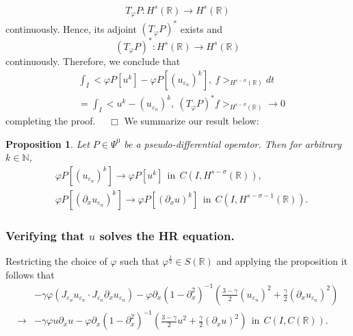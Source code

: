 \documentclass{beamer}
\newcommand{\rr}{\mathbb{R}}
\newcommand{\p}{\partial}
\newcommand{\ee}{\varepsilon}
\newcommand{\vp}{\varphi}
\newtheorem{proposition}{Proposition}
\begin{document}
\begin{frame}
	\begin{equation*}
		\begin{split}
			T_\vp P: H^s(\rr) \to H^s(\rr)
		\end{split}
	\end{equation*}
	continuously. Hence, its adjoint  $(T_\varphi P)^*$
	exists and
		\begin{equation*}
			(T_\varphi P)^*: H^s(\rr) \to H^s(\rr) 
		\end{equation*}
		continuously. Therefore, we conclude that
		\begin{equation}
			\label{widpseudo}
			\begin{split}
				& \int_I <\varphi P[u^k] - \varphi
				P [(u_{\ee_n})^k],\  f>_{H^{s-\sigma }(\rr)} dt
				\\
				&= \int_I <u^k - 
				 (u_{\ee_n})^k, \ (T_\vp P)^* f>_{H^{s-\sigma }(\rr)} \to 0
			\end{split}
		\end{equation}
		completing the proof. $\quad \Box$
		\vskip0.1in
		We summarize our result below:
  \end{frame}
  \begin{frame}
		\begin{proposition}
		\label{hhthm:crit1}
		Let $P \in \Psi^0$ be a pseudo-differential operator. Then for
		arbitrary $k \in \mathbb{N}$, 
			\begin{equation}
			\begin{split}
				& \vp P [(u_{\ee_n})^k] \to \vp P [u^k] \ \ \text{in}  \ \ C(I,
				H^{s-\sigma }(\rr)),
				\\
				& 
				\vp P [(\p_x u_{\ee_n})^k] \to \vp P [(\p_x u)^k] \ \
				\text{in}  \ \ C(I,
				H^{s-\sigma -1}(\rr)).
				\label{hhdx_vp_u_ep_conv}
			\end{split}
		\end{equation}
	\end{proposition}
		\vskip0.1in
  \end{frame}
  \begin{frame}
    \frametitle{Verifying that $u$ solves the HR equation.} 
   	Restricting the
		choice of $\vp$ such that $\vp^\frac{1}{2} \in S(\rr)$ and applying the
    proposition it follows that
		\begin{equation}
			\begin{split}
				& -\gamma \vp (J_{\ee_n} u_{\ee_n} \cdot J_{\ee_n} \p_x
				u_{\ee_n}) -
				\vp \p_x(1- \p_x^2)^{-1} \left( \frac{3-\gamma}{2}
				(u_{\ee_n})^2
				 + \frac{\gamma}{2} (\p_x u_{\ee_n})^2 \right )
				 \\
				 \to & -\gamma \vp u \p_x u -
				 \vp \p_x(1- \p_x^2)^{-1} \left( \frac{3-\gamma}{2} u^2
				 + \frac{\gamma}{2} (\p_x u)^2 \right ) \ \
				 \text{in} \ \ C(I, C(\rr)).
				\label{llloc-non-loc-tog}
			\end{split}
		\end{equation}
    \end{frame}
\end{document}
